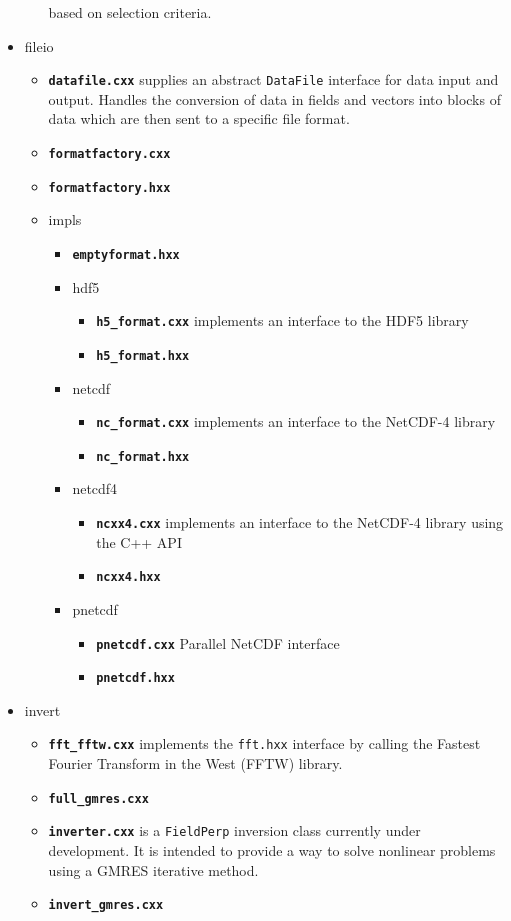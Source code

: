 \documentclass[12pt]{article}
\newcommand{\code}[1]{\texttt{#1}}
\newcommand{\file}[1]{\texttt{\bf #1}}
\begin{document}
\begin{itemize}
\begin{itemize}
    based on selection criteria.
  \end{itemize}
\item fileio
  \begin{itemize}
  \item \file{datafile.cxx} supplies an abstract \code{DataFile} interface
    for data input and output. Handles the conversion of data in fields
    and vectors into blocks of data which are then sent to a specific file
    format.
  \item \file{formatfactory.cxx}
  \item \file{formatfactory.hxx}
  \item impls
    \begin{itemize}
    \item \file{emptyformat.hxx}
    \item hdf5
      \begin{itemize}
      \item \file{h5\_format.cxx} implements an interface to the HDF5 library
      \item \file{h5\_format.hxx}
      \end{itemize}
    \item netcdf
      \begin{itemize}
      \item \file{nc\_format.cxx} implements an interface to the NetCDF-4 library
      \item \file{nc\_format.hxx}
      \end{itemize}
    \item netcdf4
      \begin{itemize}
      \item \file{ncxx4.cxx} implements an interface to the NetCDF-4
        library using the C++ API
      \item \file{ncxx4.hxx}
      \end{itemize}
    \item pnetcdf
      \begin{itemize}
        \item \file{pnetcdf.cxx} Parallel NetCDF interface
        \item \file{pnetcdf.hxx}
      \end{itemize}
    \end{itemize}
  \end{itemize}
\item invert
  \begin{itemize}
  \item \file{fft\_fftw.cxx} implements the \code{fft.hxx} interface by calling
    the Fastest Fourier Transform in the West (FFTW) library.
  \item \file{full\_gmres.cxx}
  \item \file{inverter.cxx} is a \code{FieldPerp} inversion class currently
    under development. It is intended to provide a way to solve nonlinear
    problems using a GMRES iterative method.
  \item \file{invert\_gmres.cxx}
  

\end{itemize}
\end{itemize}
\end{document}
